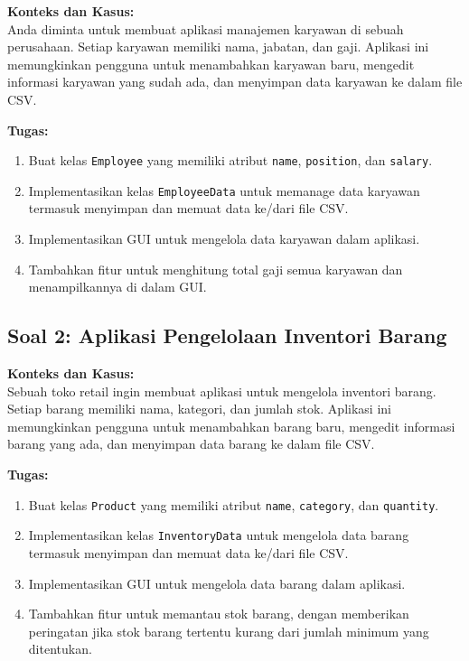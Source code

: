 \textbf{Konteks dan Kasus:} \\
Anda diminta untuk membuat aplikasi manajemen karyawan di sebuah perusahaan. Setiap karyawan memiliki nama, jabatan, dan gaji. Aplikasi ini memungkinkan pengguna untuk menambahkan karyawan baru, mengedit informasi karyawan yang sudah ada, dan menyimpan data karyawan ke dalam file CSV.

\textbf{Tugas:}
\begin{enumerate}
\item Buat kelas \texttt{Employee} yang memiliki atribut \texttt{name}, \texttt{position}, dan \texttt{salary}.
\item Implementasikan kelas \texttt{EmployeeData} untuk memanage data karyawan termasuk menyimpan dan memuat data ke/dari file CSV.
\item Implementasikan GUI untuk mengelola data karyawan dalam aplikasi.
\item Tambahkan fitur untuk menghitung total gaji semua karyawan dan menampilkannya di dalam GUI.
\end{enumerate}

\subsection*{Soal 2: Aplikasi Pengelolaan Inventori Barang}

\textbf{Konteks dan Kasus:} \\
Sebuah toko retail ingin membuat aplikasi untuk mengelola inventori barang. Setiap barang memiliki nama, kategori, dan jumlah stok. Aplikasi ini memungkinkan pengguna untuk menambahkan barang baru, mengedit informasi barang yang ada, dan menyimpan data barang ke dalam file CSV.

\textbf{Tugas:}
\begin{enumerate}
\item Buat kelas \texttt{Product} yang memiliki atribut \texttt{name}, \texttt{category}, dan \texttt{quantity}.
\item Implementasikan kelas \texttt{InventoryData} untuk mengelola data barang termasuk menyimpan dan memuat data ke/dari file CSV.
\item Implementasikan GUI untuk mengelola data barang dalam aplikasi.
\item Tambahkan fitur untuk memantau stok barang, dengan memberikan peringatan jika stok barang tertentu kurang dari jumlah minimum yang ditentukan.
\end{enumerate}